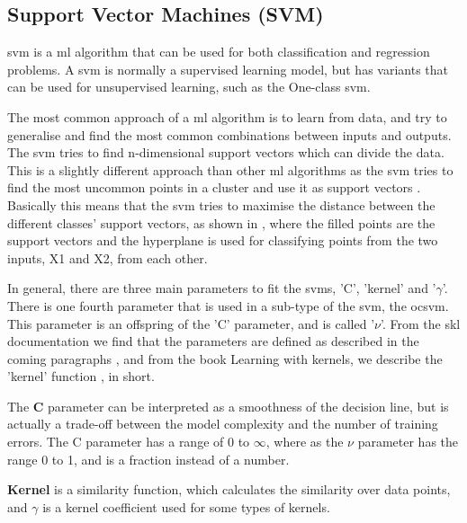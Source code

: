 \documentclass[english, a4paper]{report}
\begin{document}
{{        \subsection{Support Vector Machines (SVM)}\label{svmTheory}
        {            
            \Gls{svm} is a \gls{ml} algorithm that can be used for both classification and regression problems. A \gls{svm} is normally a supervised learning model, but has variants that can be used for unsupervised learning, such as the One-class \gls{svm}.
            \par
            The most common approach of a \gls{ml} algorithm is to learn from data, and try to generalise and find the most common combinations between inputs and outputs. The \gls{svm} tries to find n-dimensional support vectors which can divide the data. This is a slightly different approach than other \gls{ml} algorithms as the \gls{svm} tries to find the most uncommon points in a cluster and use it as support vectors \cite{pracGuideSVM}. Basically this means that the \gls{svm} tries to maximise the distance between the different classes' support vectors, as shown in , where the filled points are the support vectors and the hyperplane is used for classifying points from the two inputs, X1 and X2, from each other. 
            \par
            In general, there are three main parameters to fit the \gls{svm}s, 'C', 'kernel' and '\begin{math} \gamma \end{math}'. There is one fourth parameter that is used in a sub-type of the \gls{svm}, the \acrshort{ocsvm}. This parameter is an offspring of the 'C' parameter, and is called '\begin{math} \nu \end{math}'. From the \gls{skl} documentation we find that the parameters are defined as described in the coming paragraphs \cite{scikit-learn}, and from the book Learning with kernels, we describe the 'kernel' function \cite{scholkopf2002learning}, in short.
            \par
            The \textbf{C} parameter can be interpreted as a smoothness of the decision line, but is actually a trade-off between the model complexity and the number of training errors. The C parameter has a range of 0 to \begin{math} \infty \end{math}, where as the \textbf{\begin{math} \nu \end{math}} parameter has the range 0 to 1, and is a fraction instead of a number.
            \par
            \textbf{Kernel} is a similarity function, which calculates the similarity over data points, and \textbf{\begin{math} \gamma \end{math}} is a kernel coefficient used for some types of kernels.         
            
}}}
\end{document}
